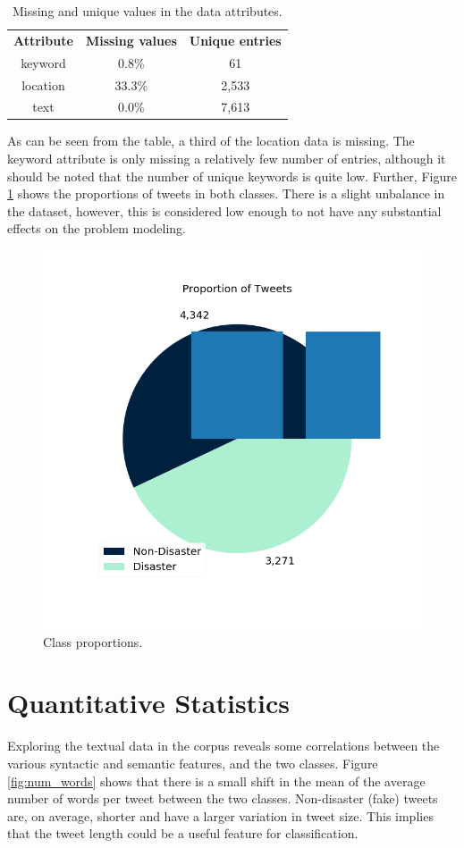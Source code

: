 \documentclass[journal, ]{IEEEtran}
\let\MYoriglatexcaption\caption
\renewcommand{\caption}[2][\relax]{\MYoriglatexcaption[#2]{#2}}
\begin{document}
\begin{table}[hbt!]
  \begin{center}
  \begin{tabular}{c|c|c} 
   \hline
    \textbf{Attribute} & \textbf{Missing values}  & \textbf{Unique entries}\\
    keyword & 0.8\% & 61\\
    location & 33.3\% & 2,533\\
    text & 0.0\% & 7,613\\
   \hline
  \end{tabular}
  \end{center}
  \caption{Missing and unique values in the data attributes.}
  \label{tab:missing_values}
\end{table}

As can be seen from the table, a third of the location data is missing. The
keyword attribute is only missing a relatively few number of entries, although
it should be noted that the number of unique keywords is quite low. Further,
Figure \ref{fig:class_proportions} shows the proportions of tweets in both
classes. There is a slight unbalance in the dataset, however, this is
considered low enough to not have any substantial effects on the problem
modeling.

\begin{figure}[hbt!]
  \centering
  \includegraphics[width=0.7\linewidth]{../figures/class_proportion.png}
  \caption{Class proportions.}
  \label{fig:class_proportions}
\end{figure}

\section{Quantitative Statistics}
Exploring the textual data in the corpus reveals some correlations between the
various syntactic and semantic features, and the two classes. Figure
\ref{fig:num_words} shows that there is a small shift in the mean of the
average number of words per tweet between the two classes. Non-disaster (fake)
tweets are, on average, shorter and have a larger variation in tweet size. This
implies that the tweet length could be a useful feature for classification.\\
\end{document}
